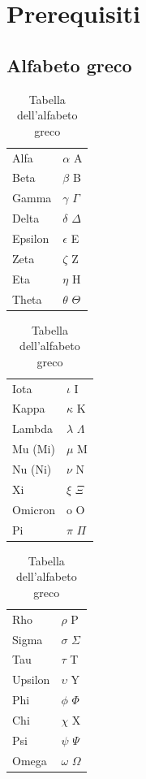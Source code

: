 \section{Prerequisiti}
\subsection{Alfabeto greco}
    \begin{table}[h]
    \centering
    \label{tab:alfabeto_greco}
    \begin{minipage}{0.32\textwidth} %
        \centering
        \begin{tabular}{ll}
            Alfa & $\alpha$ A \\
            Beta & $\beta$ B \\
            Gamma & $\gamma$ $\Gamma$ \\
            Delta & $\delta$ $\Delta$ \\
            Epsilon & $\epsilon$ E \\
            Zeta & $\zeta$ Z \\
            Eta & $\eta$ H \\
            Theta & $\theta$ $\Theta$ \\
        \end{tabular}
    \end{minipage}
    \hfill
    \begin{minipage}{0.32\textwidth} %
        \centering
        \begin{tabular}{ll}
            Iota & $\iota$ I \\
            Kappa & $\kappa$ K \\
            Lambda & $\lambda$ $\Lambda$ \\
            Mu (Mi) & $\mu$ M \\
            Nu (Ni) & $\nu$ N \\
            Xi & $\xi$ $\Xi$ \\
            Omicron & o O \\
            Pi & $\pi$ $\Pi$ \\
        \end{tabular}
    \end{minipage}
    \hfill
    \begin{minipage}{0.32\textwidth} %
        \centering
        \begin{tabular}{ll}
            Rho & $\rho$ P \\
            Sigma & $\sigma$ $\Sigma$ \\
            Tau & $\tau$ T \\
            Upsilon & $\upsilon$ Y \\
            Phi & $\phi$ $\Phi$ \\
            Chi & $\chi$ X \\
            Psi & $\psi$ $\Psi$ \\
            Omega & $\omega$ $\Omega$ \\
        \end{tabular}
    \end{minipage}
    \caption{Tabella dell'alfabeto greco}
\end{table}

